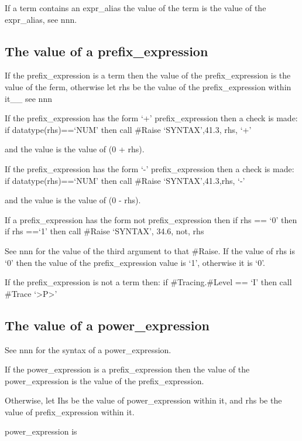 If a term contains an expr\_alias the value of the term is the value of
the expr\_alias, see nnn.

\subsection{The value of a
prefix\_expression}\label{the-value-of-a-prefix_expression}

If the prefix\_expression is a term then the value of the
prefix\_expression is the value of the ferm, otherwise let rhs be the
value of the prefix\_expression within it\_\_ see nnn

If the prefix\_expression has the form `+' prefix\_expression then a
check is made: if datatype(rhs)==`NUM' then call \#Raise `SYNTAX',41.3,
rhs, `+'

and the value is the value of (0 + rhs).

If the prefix\_expression has the form `-' prefix\_expression then a
check is made: if datatype(rhs)==`NUM' then call \#Raise
`SYNTAX',41.3,rhs, `-'

and the value is the value of (0 - rhs).

If a prefix\_expression has the form not prefix\_expression then if rhs
== `0' then if rhs ==`1' then call \#Raise `SYNTAX', 34.6, not, rhs

See nnn for the value of the third argument to that \#Raise. If the
value of rhs is `0' then the value of the prefix\_expression value is
`1', otherwise it is `0'.

If the prefix\_expression is not a term then: if \#Tracing.\#Level ==
`I' then call \#Trace `\textgreater P\textgreater{}'

\subsection{The value of a
power\_expression}\label{the-value-of-a-power_expression}

See nnn for the syntax of a power\_expression.

If the power\_expression is a prefix\_expression then the value of the
power\_expression is the value of the prefix\_expression.

Otherwise, let Ihs be the value of power\_expression within it, and rhs
be the value of prefix\_expression within it.


power\_expression is

